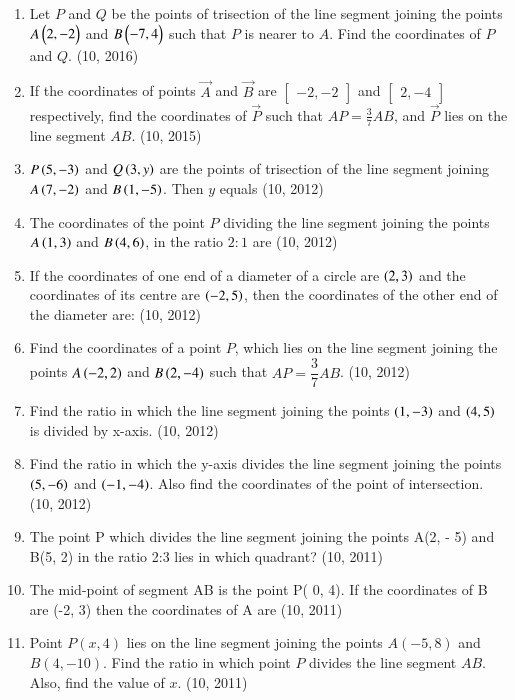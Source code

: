 \begin{enumerate}[label=\thesubsection.\arabic*,ref=\thesubsection.\theenumi]
    \item Let $P$ and $Q$ be the points of trisection of the line segment joining the points $A \begin{pmatrix}2,-2\end{pmatrix}$ and $B \begin{pmatrix}-7, 4\end{pmatrix}$ such that $P$ is nearer to $A$. Find the coordinates of $P$ and $Q$. \hfill (10, 2016)
\item If the coordinates of points $\vec{A}$ and $\vec{B}$ are $\begin{bmatrix}-2, -2\end{bmatrix}$ and $\begin{bmatrix}2, -4\end{bmatrix}$ respectively, find the coordinates of $\vec{P}$ such that $AP = \frac{3}{7} AB$, and $\vec{P}$ lies on the line segment $AB$. \hfill (10, 2015)
\item  $P\left(5,-3\right)$ and $Q\left(3,y\right)$ are the points of trisection of the line segment joining $A\left(7,-2\right)$ and $B\left(1,-5\right)$. Then $y$ equals
\hfill (10, 2012)
\item The coordinates of the point $P$ dividing the line segment joining the points $A\left(1,3\right)$ and $B\left(4,6\right)$, in the ratio $2:1$ are
\hfill (10, 2012)
\item If the coordinates of one end of a diameter of a circle are $\left(2,3\right)$ and the coordinates of its centre are $\left(-2,5\right)$, then the coordinates of the other end of the diameter are:
\hfill (10, 2012)
\item Find the coordinates of a point $P$, which lies on the line segment joining the points $A\left(-2,2\right)$ and $B\left(2,-4\right)$ such that $AP = \dfrac{3}{7} AB$. 
\hfill (10, 2012)
\item Find the ratio in which the line segment joining the points $\left(1,-3\right)$ and $\left(4,5\right)$ is divided by x-axis. 
\hfill (10, 2012)
\item Find the ratio in which the y-axis divides the line segment joining the points $\left(5,-6\right)$ and $\left(-1,-4\right)$. Also find the coordinates of the point of intersection. 
\hfill (10, 2012)
    \item The point P which divides the line segment joining the points A(2, - 5) and B(5, 2) in the ratio 2:3 lies in which quadrant?
\hfill (10, 2011)
    \item The mid-point of segment AB is the point P( 0, 4). If the coordinates of B are (-2, 3) then the coordinates of A are
\hfill (10, 2011)
\item Point $P(x, 4)$ lies on the line segment joining the points $A (-5,8)$ and $B (4, -10)$. Find the ratio in which point $P$ divides the line segment $AB$. Also, find the value of $x$.
\hfill (10, 2011)
\end{enumerate}

